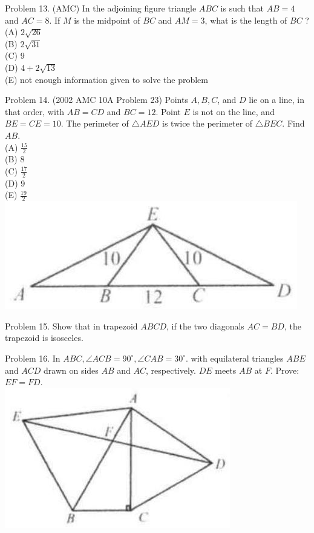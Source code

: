 \documentclass[10pt]{article}
\begin{document}
Problem 13. (AMC) In the adjoining figure triangle \(A B C\) is such that \(A B=4\) and \(A C=8\). If \(M\) is the midpoint of \(B C\) and \(A M=3\), what is the length of \(B C\) ?\\
(A) \(2 \sqrt{26}\)\\
(B) \(2 \sqrt{31}\)\\
(C) 9\\
(D) \(4+2 \sqrt{13}\)\\
(E) not enough information given to solve the problem

Problem 14. (2002 AMC 10A Problem 23) Points \(A, B, C\), and \(D\) lie on a line, in that order, with \(A B=C D\) and \(B C=12\). Point \(E\) is not on the line, and \(B E=C E=10\). The perimeter of \(\triangle A E D\) is twice the perimeter of \(\triangle B E C\). Find \(A B\).\\
(A) \(\frac{15}{2}\)\\
(B) 8\\
(C) \(\frac{17}{2}\)\\
(D) 9\\
(E) \(\frac{19}{2}\)\\
\includegraphics[max width=\textwidth, center]{2025_04_17_97bc1f7e44d93c271a88g-090(3)}

Problem 15. Show that in trapezoid \(A B C D\), if the two diagonals \(A C=B D\), the trapezoid is isosceles.

Problem 16. In \(A B C, \angle A C B=90^{\circ}, \angle C A B=30^{\circ}\). with equilateral triangles \(A B E\) and \(A C D\) drawn on sides \(A B\) and \(A C\), respectively. \(D E\) meets \(A B\) at \(F\). Prove: \(E F=F D\).\\
\includegraphics[max width=\textwidth, center]{2025_04_17_97bc1f7e44d93c271a88g-090}
\end{document}
